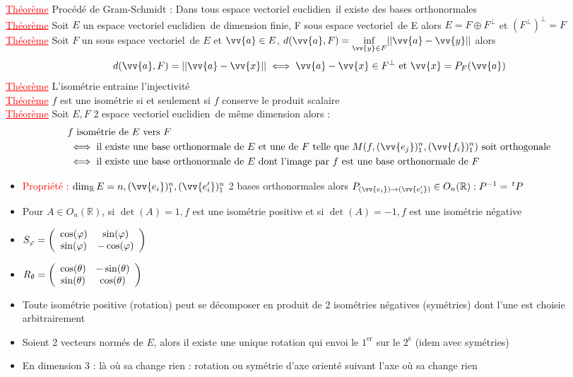 \documentclass[a4paper, 11pts, french]{article}
\newcommand{\R}{\mathbb{R}}
\newcommand{\ev}{espace vectoriel}
\newcommand{\eve}{espace vectoriel euclidien}
\newcommand{\te}{\theta}
\newcommand{\ph}{\varphi}
\newcommand{\thm}{\textcolor{red}{\underline{Théorème} }}
\newcommand{\ppt}{\textcolor{red}{Propriété : }}
\begin{document}
	  \thm Procédé de Gram-Schmidt : Dans tous  \eve \, il existe des bases orthonormales \\
	  \thm Soit $E$ un \eve \, de dimension finie, F sous \ev\, de E alors $E=F\oplus F^{\perp}$ et $(F^{\perp})^{\perp}=F$ \\
	  \thm Soit $F$ un sous \ev \, de $E$ et $\vv{a} \in E$, $d(\vv{a},F)=\underset{\vv{y} \in F}\inf ||\vv{a}-\vv{y}||$ alors $$d(\vv{a},F)=||\vv{a}-\vv{x}|| \iff \vv{a}-\vv{x} \in F^{\perp} \text{ et }\vv{x}=P_F(\vv{a})$$
	  \thm L'isométrie entraine l'injectivité \\
	  \thm $f$ est une isométrie si et seulement si $f$ conserve le produit scalaire \\
	  \thm Soit $E,F$ 2 \eve \, de même dimension alors :
			 \begin{align*}
				 &f \text{ isométrie de $E$ vers $F$} \\
				 &\iff \text{il existe une base orthonormale de $E$ et une de $F$ telle que $M(f,(\vv{e_j})_1^n,(\vv{f_i})_1^n)$ soit orthogonale} \\
				 &\iff \text{il existe une base orthonormale de $E$ dont l'image par $f$ est une base orthonormale de $F$}
			 \end{align*}
	 \begin{itemize}
		\item \ppt $\dim_{\R}E=n, (\vv{e_i})_1^n,(\vv{e'_i})_1^n$ 2 bases orthonormales alors $P_{(\vv{e_i}) \rightarrow (\vv{e'_i})} \in O_n(\R) : P^{-1}=\,^tP$
		\item Pour $A \in O_n(\R)$, si $\det(A)=1, f$ est une isométrie positive et si $\det(A)=-1,f$ est une isométrie négative
		\item $S_\ph=\left( \begin{array}{c c} \cos(\ph) & \sin(\ph) \\ \sin(\ph) & -\cos(\ph) \end{array} \right)$
		\item $R_\te=\left( \begin{array}{c c} \cos(\te) & -\sin(\te) \\ \sin(\te) & \cos(\te) \end{array} \right)$
		\item Toute isométrie positive (rotation) peut se décomposer en produit de 2 isométries négatives (symétries) dont l'une est choisie arbitrairement
		\item Soient 2 vecteurs normés de $E$, alors il existe une unique rotation qui envoi le $1^{\text{er}}$ sur le $2^{\text{è}}$ (idem avec symétries)
		\item En dimension 3 : là où sa change rien : rotation ou symétrie d'axe orienté suivant l'axe où sa change rien
	 \end{itemize}
	 
\end{document}
